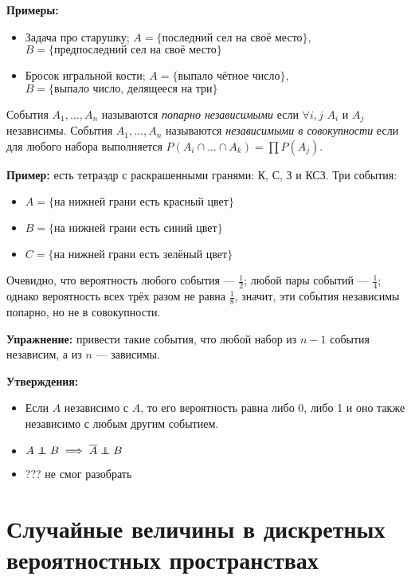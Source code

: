 \textbf{Примеры:}
\begin{itemize}
    \item Задача про старушку; $A = \{\text{последний сел на своё место}\}$, \\ $B = \{\text{предпоследний сел на своё место}\}$
    \item Бросок игральной кости;  $A = \{\text{выпало чётное число}\}$, \\ $B = \{\text{выпало число, делящееся на три}\}$
\end{itemize}

События $A_1, \ldots, A_n$ называются \emph{попарно независимыми} если $\forall i, j$ $A_i$ и $A_j$ независимы.
События $A_1, \ldots, A_n$ называются \emph{независимыми в совокупности} если для любого набора выполняется $P(A_i\cap\ldots\cap A_k) = \prod P(A_j)$.

\textbf{Пример:} есть тетраэдр с раскрашенными гранями: К, С, З и КСЗ. Три события:
\begin{itemize}
    \item  $A = \{\text{на нижней грани есть красный цвет}\}$
    \item  $B = \{\text{на нижней грани есть синий цвет}\}$
    \item  $C = \{\text{на нижней грани есть зелёный цвет}\}$
\end{itemize}

Очевидно, что вероятность любого события --- $\frac{1}{2}$; любой пары событий --- $\frac{1}{4}$; однако вероятность всех трёх разом не равна $\frac{1}{8}$, значит, эти события независимы попарно, но не в совокупности.

\textbf{Упражнение:} привести такие события, что любой набор из $n-1$ события независим, а из $n$ --- зависимы.

\textbf{Утверждения:}
\begin{itemize}
    \item Если $A$ независимо с $A$, то его вероятность равна либо 0, либо 1 и оно также независимо с любым другим событием.
    \item $A \independent B \implies \overline{A}\independent B$
    \item ??? не смог разобрать
\end{itemize}

\section{Случайные величины в дискретных вероятностных пространствах}

